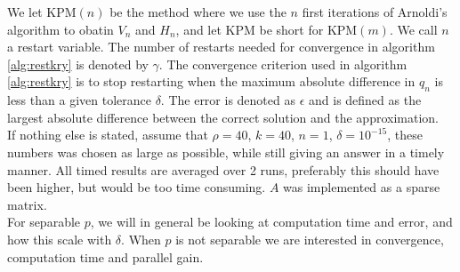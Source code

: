 We let KPM$(n)$ be the method where we use the $n$ first iterations of Arnoldi's algorithm to obatin $V_n$ and $H_n$, and let KPM be short for KPM$(m)$. We call $n$ a restart variable. The number of restarts needed for convergence in algorithm \ref{alg:restkry} is denoted by $\gamma$. The convergence criterion used in algorithm \ref{alg:restkry} is to stop restarting when the maximum absolute difference in $q_n$ is less than a given tolerance $\delta$. The error is denoted as $\epsilon$ and is defined as the largest absolute difference between the correct solution and the approximation. \\

If nothing else is stated, assume that $\rho =40$, $k = 40$, $n = 1$, $\delta = 10^{-15}$, these numbers was chosen as large as possible, while still giving an answer in a timely manner. All timed results are averaged over 2 runs, preferably this should have been higher, but would be too time consuming. $A$ was implemented as a sparse matrix.\\
 
For separable $p$, we will in general be looking at computation time and error, and how this scale with $\delta$. When $p$ is not separable we are interested in convergence, computation time and parallel gain. \\



